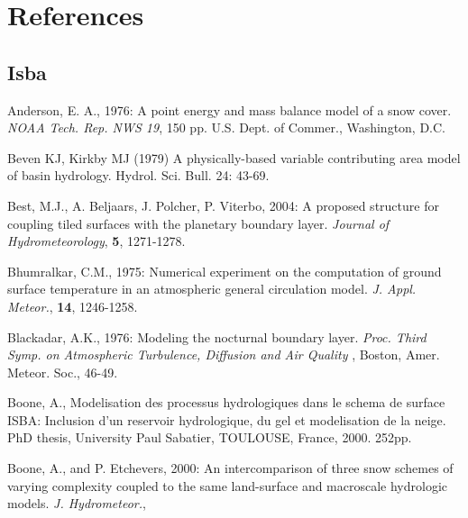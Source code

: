 
\chapter{References}
\minitoc

\section{Isba}
\begin{description}

\item
Anderson, E. A., 1976:
A point energy and mass balance model of a snow cover.
{\it NOAA Tech. Rep. NWS 19}, 150 pp. U.S. Dept. of
Commer., Washington, D.C.

\item
Beven KJ, Kirkby MJ (1979) A physically-based variable contributing area model of basin 
hydrology. Hydrol. Sci. Bull. 24: 43-69.

\item
Best, M.J., A. Beljaars, J. Polcher, P. Viterbo, 2004:
A proposed structure for coupling tiled surfaces with the planetary boundary layer.
{\em Journal of Hydrometeorology}, {\bf 5}, 1271-1278.

\item
Bhumralkar, C.M., 1975:
Numerical experiment on the computation of ground surface
temperature in an atmospheric general circulation model.
{\em J. Appl. Meteor.}, {\bf 14}, 1246-1258.

\item
Blackadar, A.K., 1976:
Modeling the nocturnal boundary layer.
{\em Proc. Third Symp. on Atmospheric Turbulence,
Diffusion and Air Quality }, Boston, Amer. Meteor. Soc., 46-49.

\item
Boone, A., Modelisation des processus hydrologiques dans le schema de surface ISBA: Inclusion d'un reservoir hydrologique, du gel et modelisation de la neige. PhD thesis, University Paul Sabatier, TOULOUSE, France, 2000. 252pp.

\item
Boone, A.,
and P. Etchevers, 2000:
An intercomparison of three snow schemes of varying complexity
coupled to the same land-surface and macroscale hydrologic models.
{\em J. Hydrometeor.},



\end{description}
